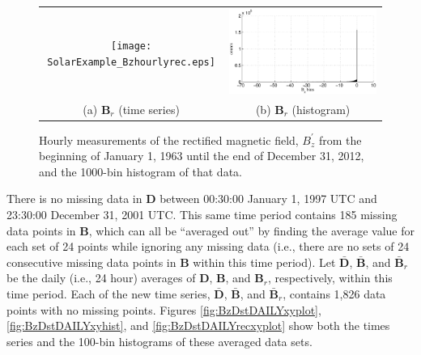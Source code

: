 \begin{figure}[ht]
\begin{tabular}{cc}
\texttt{[image: SolarExample\_Bzhourlyrec.eps]} & \includegraphics[scale=0.51]{SolarExample_Bzhourlyrechist.eps} \\
(a) $\mathbf{B}_r$ (time series) & (b) $\mathbf{B}_r$ (histogram)
\end{tabular}
\caption{Hourly measurements of the rectified magnetic field, $B_z^\prime$ from the beginning of January 1, 1963 until the end of December 31, 2012, and the 1000-bin histogram of that data.}
\label{fig:BzDstHOURLYrecxyplot}
\end{figure}

There is no missing data in $\mathbf{D}$ between 00:30:00 January 1, 1997 UTC and 23:30:00 December 31, 2001 UTC.  This same time period contains 185 missing data points in $\mathbf{B}$, which can all be ``averaged out'' by finding the average value for each set of 24 points while ignoring any missing data (i.e., there are no sets of 24 consecutive missing data points in $\mathbf{B}$ within this time period).  Let $\bar{\mathbf{D}}$, $\bar{\mathbf{B}}$, and $\bar{\mathbf{B}}_r$ be the daily (i.e., 24 hour) averages of $\mathbf{D}$, $\mathbf{B}$, and $\mathbf{B}_r$, respectively, within this time period.  Each of the new time series, $\bar{\mathbf{D}}$, $\bar{\mathbf{B}}$, and $\bar{\mathbf{B}}_r$, contains 1,826 data points with no missing points.  Figures \ref{fig:BzDstDAILYxyplot}, \ref{fig:BzDstDAILYxyhist}, and \ref{fig:BzDstDAILYrecxyplot} show both the times series and the 100-bin histograms of these averaged data sets.  

